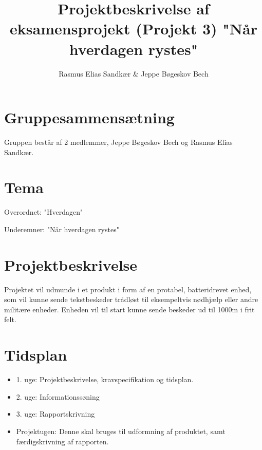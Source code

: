 \documentclass[12pt, a4paper]{article}
\title{Projektbeskrivelse af eksamensprojekt (Projekt 3) "Når hverdagen rystes"}
\author{Rasmus Elias Sandkær \& Jeppe Bøgeskov Bech}
\begin{document}
\maketitle

\section{Gruppesammensætning}
Gruppen består af 2 medlemmer, Jeppe Bøgeskov Bech og Rasmus Elias Sandkær.

\section{Tema}
Overordnet: "Hverdagen"

Underemner: "Når hverdagen rystes"

\section{Projektbeskrivelse}
Projektet vil udmunde i et produkt i form af en protabel, batteridrevet enhed, som vil kunne sende tekstbeskeder trådløst til eksempeltvis nødhjælp eller andre militære enheder. Enheden vil til start kunne sende beskeder ud til 1000m i frit felt.

\section{Tidsplan}
\begin{itemize}
    \item 1. uge: Projektbeskrivelse, kravspecifikation og tidsplan.
    \item 2. uge: Informationssøning
    \item 3. uge: Rapportskrivning
    \item Projektugen: Denne skal bruges til udformning af produktet, samt færdigskrivning af rapporten.
\end{itemize}
\end{document}
